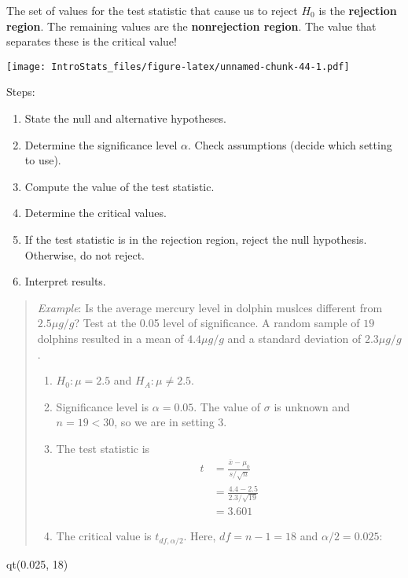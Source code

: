 \documentclass[
]{book}
\newenvironment{Shaded}{\begin{snugshade}}{\end{snugshade}}
\newcommand{\DecValTok}[1]{\textcolor[rgb]{0.00,0.00,0.81}{#1}}
\newcommand{\FloatTok}[1]{\textcolor[rgb]{0.00,0.00,0.81}{#1}}
\newcommand{\FunctionTok}[1]{\textcolor[rgb]{0.00,0.00,0.00}{#1}}
\newcommand{\NormalTok}[1]{#1}
\providecommand{\tightlist}{%
  \setlength{\itemsep}{0pt}\setlength{\parskip}{0pt}}
\begin{document}
The set of values for the test statistic that cause us to reject \(H_0\) is the \textbf{rejection region}. The remaining values are the \textbf{nonrejection region}. The value that separates these is the critical value!

\texttt{[image: IntroStats\_files/figure-latex/unnamed-chunk-44-1.pdf]}

Steps:

\begin{enumerate}
\def\labelenumi{\arabic{enumi}.}
\tightlist
\item
  State the null and alternative hypotheses.
\item
  Determine the significance level \(\alpha\). Check assumptions (decide which setting to use).
\item
  Compute the value of the test statistic.
\item
  Determine the critical values.
\item
  If the test statistic is in the rejection region, reject the null hypothesis. Otherwise, do not reject.
\item
  Interpret results.
\end{enumerate}

\begin{quote}
\emph{Example}: Is the average mercury level in dolphin muslces different from \(2.5\mu g/g\)? Test at the 0.05 level of significance. A random sample of \(19\) dolphins resulted in a mean of \(4.4 \mu g/g\) and a standard deviation of \(2.3 \mu g/g\).

\begin{enumerate}
\def\labelenumi{\arabic{enumi}.}
\tightlist
\item
  \(H_0: \mu = 2.5\) and \(H_A: \mu \ne 2.5\).
\item
  Significance level is \(\alpha=0.05\). The value of \(\sigma\) is unknown and \(n = 19 < 30\), so we are in setting 3.
\item
  The test statistic is \begin{align} t &= \frac{\bar{x}-\mu_0}{s/\sqrt{n}} \\ &= \frac{4.4-2.5}{2.3/\sqrt{19}} \\ &= 3.601 \end{align}
\item
  The critical value is \(t_{df, \alpha/2}\). Here, \(df=n-1=18\) and \(\alpha/2 = 0.025\):
\end{enumerate}
\end{quote}

\begin{Shaded}
\begin{Highlighting}[]
\FunctionTok{qt}\NormalTok{(}\FloatTok{0.025}\NormalTok{, }\DecValTok{18}\NormalTok{)}
\end{Highlighting}
\end{Shaded}
\end{document}

